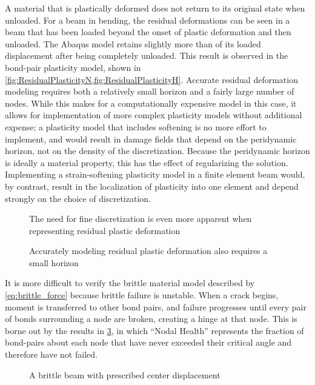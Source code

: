 A material that is plastically deformed does not return to its original state when unloaded.
For a beam in bending, the residual deformations can be seen in a beam that has been loaded beyond the onset of plastic deformation and then unloaded.
The Abaqus model retains slightly more than  of its loaded displacement after being completely unloaded.
This result is observed in the bond-pair plasticity model, shown in \cref{fig:ResidualPlasticityN,fig:ResidualPlasticityH}. 
Accurate residual deformation modeling requires both a relatively small horizon and a fairly large number of nodes.
While this makes for a computationally expensive model in this case, it allows for implementation of more complex plasticity models without additional expense; a plasticity model that includes softening is no more effort to implement, and would result in damage fields that depend on the peridynamic horizon, not on the density of the discretization.
Because the peridynamic horizon is ideally a material property, this has the effect of regularizing the solution.
Implementing a strain-softening plasticity model in a finite element beam would, by contrast, result in the localization of plasticity into one element and depend strongly on the choice of discretization.

%
\begin{figure}[h]
  \centering
  \resizebox{0.6\linewidth}{!}{}
  \caption{The need for fine discretization is even more apparent when representing residual plastic deformation}
  \label{fig:ResidualPlasticityN}
\end{figure}
%
\begin{figure}[h]
  \centering
  \resizebox{0.6\linewidth}{!}{}
  \caption{Accurately modeling residual plastic deformation also requires a small horizon}
  \label{fig:ResidualPlasticityH}
\end{figure}

It is more difficult to verify the brittle material model described by \cref{eq:brittle_force} because brittle failure is unstable.
When a crack begins, moment is transferred to other bond pairs, and failure progresses until every pair of bonds surrounding a node are broken, creating a hinge at that node.
This is borne out by the results in \cref{fig:brittleBeam}, in which ``Nodal Health'' represents the fraction of bond-pairs about each node that have never exceeded their critical angle and therefore have not failed.

\begin{figure}[h]
  \centering
  \resizebox{0.7\linewidth}{!}{}
  \caption{A brittle beam with prescribed center displacement}
  \label{fig:brittleBeam}
\end{figure}

